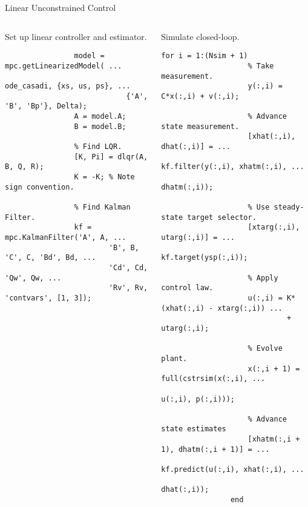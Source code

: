 \documentclass[xcolor=dvipsnames,handout]{beamer}
\begin{document}
\begin{frame}[fragile]{Linear Unconstrained Control}
    \begin{columns}[t]
        \begin{column}{.475\textwidth}
            Set up linear controller and estimator.
            
            \begin{lstlisting}[gobble=16,basicstyle=\ttfamily\fontsize{6}{8}\selectfont]
                % Get linearized model.
                model = mpc.getLinearizedModel( ...
                            ode_casadi, {xs, us, ps}, ...
                            {'A', 'B', 'Bp'}, Delta);
                A = model.A;
                B = model.B;
                
                % Find LQR.
                [K, Pi] = dlqr(A, B, Q, R);
                K = -K; % Note sign convention.
                
                % Find Kalman Filter.
                kf = mpc.KalmanFilter('A', A, ...
                        'B', B, 'C', C, 'Bd', Bd, ...
                        'Cd', Cd, 'Qw', Qw, ...
                        'Rv', Rv, 'contvars', [1, 3]);
            \end{lstlisting}
        \end{column} \pause
        \begin{column}{.475\textwidth}
            Simulate closed-loop.
            
            \begin{lstlisting}[gobble=16,basicstyle=\ttfamily\fontsize{6}{8}\selectfont]
                for i = 1:(Nsim + 1)
                    % Take measurement.
                    y(:,i) = C*x(:,i) + v(:,i);
                    
                    % Advance state measurement.
                    [xhat(:,i), dhat(:,i)] = ...
                        kf.filter(y(:,i), xhatm(:,i), ...
                                  dhatm(:,i));
                    
                    % Use steady-state target selector.
                    [xtarg(:,i), utarg(:,i)] = ...
                        kf.target(ysp(:,i));
                    
                    % Apply control law.
                    u(:,i) = K*(xhat(:,i) - xtarg(:,i)) ...
                             + utarg(:,i);
                    
                    % Evolve plant.
                    x(:,i + 1) = full(cstrsim(x(:,i), ...
                                   u(:,i), p(:,i)));
                    
                    % Advance state estimates
                    [xhatm(:,i + 1), dhatm(:,i + 1)] = ...
                        kf.predict(u(:,i), xhat(:,i), ...
                                   dhat(:,i));
                end
            \end{lstlisting}
        \end{column}
    \end{columns}
\end{frame}
\end{document}
